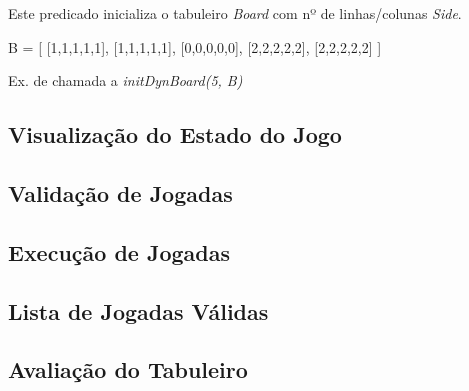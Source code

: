\documentclass[15pt,a4paper]{article}
\begin{document}
Este predicado inicializa o tabuleiro \textit{Board} com nº de linhas/colunas \textit{Side}.

\begin{code}[H]
	\begin{verbatimtab}
B = [
	[1,1,1,1,1],
	[1,1,1,1,1],
	[0,0,0,0,0],
	[2,2,2,2,2],
	[2,2,2,2,2]
	]
\end{verbatimtab}
\caption{Ex. de chamada a \textit{initDynBoard(5, B)}}
\end{code}


\subsection{Visualização do Estado do Jogo}




\subsection{Validação de Jogadas}



\subsection{Execução de Jogadas}




\subsection{Lista de Jogadas Válidas}




\subsection{Avaliação do Tabuleiro}
\end{document}
